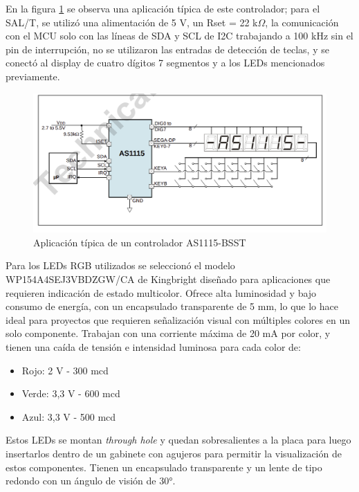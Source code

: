 En la figura \ref{fig:led_driver} se observa una aplicación típica de este controlador; para el SAL/T, se utilizó una alimentación de 5 V, un Rset = 22 k$\Omega$, la comunicación con el MCU solo con las líneas de SDA y SCL de I2C trabajando a 100 kHz sin el pin de interrupción, no se utilizaron las entradas de detección de teclas, y se conectó al display de cuatro dígitos 7 segmentos y a los LEDs mencionados previamente. \\

\begin{figure}[H]
    \centering
    \includegraphics[width = \linewidth]{img/led_driver.png}
    \caption{Aplicación típica de un controlador AS1115-BSST}
    \label{fig:led_driver}
\end{figure}    




Para los LEDs RGB utilizados se seleccionó el modelo WP154A4SEJ3VBDZGW/CA de Kingbright \cite{WP154A4SEJ3VBDZGW/CA} diseñado para aplicaciones que requieren indicación de estado multicolor. Ofrece alta luminosidad y bajo consumo de energía, con un encapsulado transparente de 5 mm, lo que lo hace ideal para proyectos que requieren señalización visual con múltiples colores en un solo componente. Trabajan con una corriente máxima de 20 mA por color, y tienen una caída de tensión e intensidad luminosa para cada color de: 

\begin{itemize}
    \item Rojo: 2 V - 300 mcd
    \item Verde: 3,3 V - 600 mcd
    \item Azul: 3,3 V - 500 mcd
\end{itemize}

Estos LEDs se montan \textit{through hole} y quedan sobresalientes a la placa para luego insertarlos dentro de un gabinete con agujeros para permitir la visualización de estos componentes. Tienen un encapsulado transparente y un lente de tipo redondo con un ángulo de visión de 30°.\\ 

